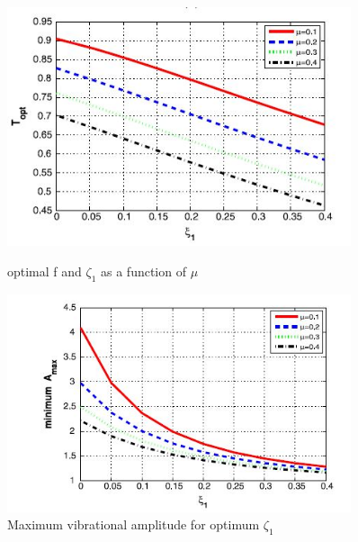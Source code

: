 \begin{figure}[h!]
    \centering
    \begin{minipage}{0.45\textwidth}
        \centering
        \includegraphics[width=0.9\textwidth]{"figures/11"}
        \caption{optimal f and $\zeta_1$ as a function of $\mu $}
        \label{11}
    \end{minipage}\hfill
    \begin{minipage}{0.45\textwidth}
        \centering
        \includegraphics[width=0.9\textwidth]{"figures/12"}
        \caption{Maximum vibrational amplitude for optimum $\zeta_1$ }
    \end{minipage}
    
\end{figure}
